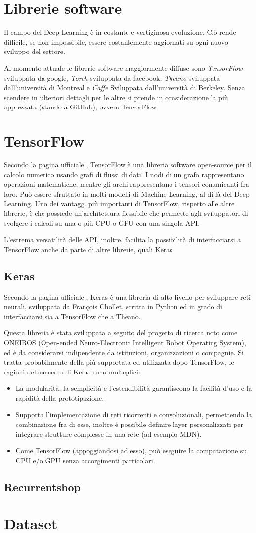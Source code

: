 \section{Librerie software}
Il campo del Deep Learning è in costante e vertiginosa evoluzione. Ciò rende difficile, se non impossibile, essere costantemente aggiornati su ogni nuovo sviluppo del settore.

Al momento attuale le librerie software maggiormente diffuse sono \textit{TensorFlow} sviluppata da google, \textit{Torch} sviluppata da facebook, \textit{Theano} sviluppata dall'università di Montreal e \textit{Caffe} Sviluppata dall'università di Berkeley. Senza scendere in ulteriori dettagli per le altre si prende in considerazione la più apprezzata (stando a GitHub), ovvero TensorFlow
\section{TensorFlow} %
\label{sec:tensorflow}
Secondo la pagina ufficiale \cite{tensorflow}, TensorFlow è una libreria software open-source per il calcolo numerico usando grafi di flussi di dati. I nodi di un grafo rappresentano operazioni matematiche, mentre gli archi rappresentano i tensori comunicanti fra loro. Può essere sfruttato in molti modelli di Machine Learning, al di là del Deep Learning. Uno dei vantaggi più importanti di TensorFlow, rispetto alle altre librerie, è che possiede un'architettura flessibile che permette agli sviluppatori di svolgere i calcoli su una o più CPU o GPU con una singola API.

L'estrema versatilità delle API, inoltre, facilita la possibilità di interfacciarsi a TensorFlow anche da parte di altre librerie, quali Keras.
\subsection{Keras}
Secondo la pagina ufficiale \cite{keras}, Keras è una libreria di alto livello per sviluppare reti neurali, sviluppata da Fran\c{c}ois Chollet, scritta in Python ed in grado di interfacciarsi sia a TensorFlow che a Theano.

Questa libreria è stata sviluppata a seguito del progetto di ricerca noto come ONEIROS (Open-ended Neuro-Electronic Intelligent Robot Operating System), ed è da considerarsi indipendente da istituzioni, organizzazioni o compagnie. Si tratta probabilmente della più supportata ed utilizzata dopo TensorFlow, le ragioni del successo di Keras sono molteplici: 
\begin{itemize}
	\item La modularità, la semplicità e l'estendibilità garantiscono la facilità d'uso e la rapidità della prototipazione.
	\item Supporta l'implementazione di reti ricorrenti e convoluzionali, permettendo la combinazione fra di esse, inoltre è possibile definire layer personalizzati per integrare strutture complesse in una rete (ad esempio MDN).
	\item Come TensorFlow (appoggiandosi ad esso), può eseguire la computazione su CPU e/o GPU senza accorgimenti particolari.
\end{itemize}
\subsection{Recurrentshop}
\section{Dataset}